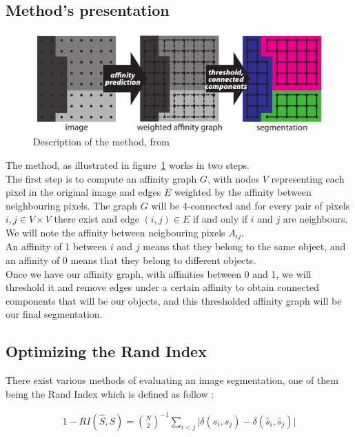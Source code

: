 \subsection{Method's presentation}

\begin{figure}[!htbp]
	\centering
	\includegraphics[width=0.8\linewidth]{./images/malis_method.png}
	\caption{Description of the method, from~\cite{turaga_maximin_2009}}%
	\label{fig:malis_method}
\end{figure}

The method, as illustrated in figure~\ref{fig:malis_method} works in two steps.\\
The first step is to compute an affinity graph $G$, with nodes $V$ representing
each pixel in the original image and edges $E$ weighted by the affinity between
neighbouring pixels. The graph $G$ will be 4-connected and for every pair of
pixels $i, j \in V\times V$ there exist and edge $(i,j)\in E$ if and only if $i$ and $j$ are
neighbours. We will note the affinity between neigbouring pixels $A_{ij}$.\\
An affinity of 1 between $i$ and $j$ means that they belong to the same object,
and an affinity of 0 means that they belong to different objects.\\

Once we have our affinity graph, with affinities between 0 and 1, we will
threshold it and remove edges under a certain affinity to obtain connected
components that will be our objects, and this thresholded affinity graph will
be our final segmentation.\\


\subsection{Optimizing the Rand Index}

There exist various methods of evaluating an image segmentation, one of them
being the Rand Index which is defined as follow :

\begin{gather*}
	1 - RI(\hat{S},S) = \binom{N}{2}^{-1} \sum_{i<j} \lvert \delta(s_i,s_j) -
	\delta(\hat{s}_i,\hat{s}_j) \rvert
\end{gather*}

